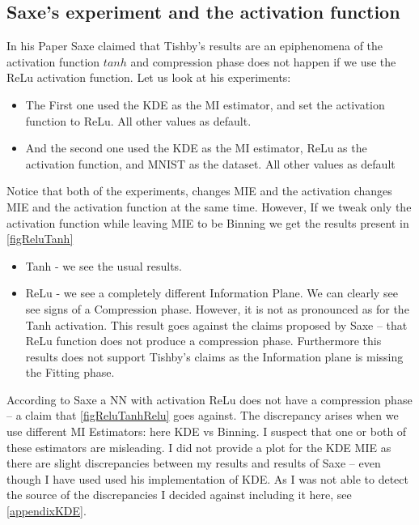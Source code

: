 \documentclass[dissertation.tex]{subfiles}
\begin{document}
\subsection{Saxe's experiment and the activation function} 

In his Paper Saxe claimed that Tishby's results are an epiphenomena of the
activation function $tanh$ and compression phase does not happen if we use the
ReLu activation function. Let us look at his experiments:
\begin{itemize}
  \item{
      The First one used the KDE as the MI estimator, and set the activation
      function to ReLu. All other values as default.
    }
  \item{
      And the second one used the KDE as the MI estimator, ReLu as the
      activation function, and MNIST as the dataset. All other values as default
    }
\end{itemize}
Notice that both of the experiments, changes MIE and the activation changes MIE
and the activation function at the same time. However, If we tweak only the
activation function while leaving MIE to be Binning we get the results present
in \autoref{figReluTanh}
\begin{itemize}
  \item{
      Tanh - we see the usual results.
    }
  \item{
      ReLu - we see a completely different Information Plane. We can clearly see
      see signs of a Compression phase. However, it is not as pronounced
      as for the Tanh activation. This result goes against the claims proposed
      by Saxe -- that ReLu function does not produce a compression phase.
      Furthermore this results does not support Tishby's claims as the
      Information plane is missing the Fitting phase.
    }
\end{itemize}
According to Saxe a NN with activation ReLu does not have a compression phase --
a claim that \autoref{figReluTanhRelu} goes against. The discrepancy arises when
we use different MI Estimators: here KDE vs Binning. I suspect that one or both
of these estimators are misleading. I did not provide a plot for the KDE MIE as
there are slight discrepancies between my results and results of Saxe -- even
though I have used used his implementation of KDE. As I was not able to detect
the source of the discrepancies I decided against including it here, see
\autoref{appendixKDE}.
\end{document}
